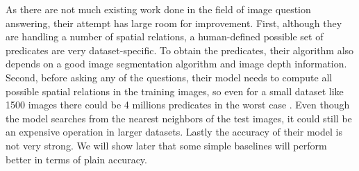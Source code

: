 \documentclass{article}
\renewcommand{\#}[1]{\textbf{#1}}
\begin{document}
As there are not much existing work done in the field of image question answering, their attempt has large room for improvement. First, although they are handling a number of spatial relations, a human-defined possible set of predicates are very dataset-specific. To obtain the predicates, their algorithm also depends on a good image segmentation algorithm and image depth information. Second, before asking any of the questions, their model needs to compute all possible spatial relations in the training images, so even for a small dataset like 1500 images there could be 4 millions predicates in the worst case \cite{malinowski14b}. Even though the model searches from the nearest neighbors of the test images, it could still be an expensive operation in larger datasets. Lastly the accuracy of their model is not very strong. We will show later that some simple baselines will perform better in terms of plain accuracy.
\end{document}
